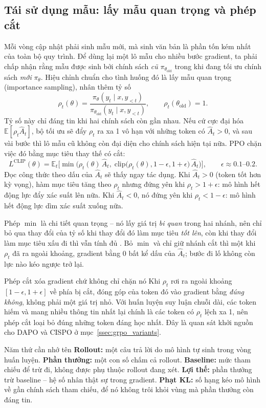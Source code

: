 \subsection{Tái sử dụng mẫu: lấy mẫu quan trọng và phép cắt}
\label{ssec:importance_clip}

Mỗi vòng cập nhật phải sinh mẫu mới, mà sinh văn bản là phần tốn kém nhất của toàn bộ quy trình. Để dùng lại một lô mẫu cho nhiều bước gradient, ta phải chấp nhận rằng mẫu được sinh bởi chính sách \emph{cũ} $\pi_{\theta_{\text{old}}}$ trong khi đang tối ưu chính sách \emph{mới} $\pi_{\theta}$. Hiệu chỉnh chuẩn cho tình huống đó là lấy mẫu quan trọng (importance sampling), nhân thêm tỷ số
\[
	\rho_t(\theta) = \frac{
		\pi_{\theta}(y_t \mid x, y_{<t})
	}{
		\pi_{\theta_{\text{old}}}(y_t \mid x, y_{<t})
	},
	\qquad
	\rho_t(\theta_{\text{old}}) = 1 .
\]
Tỷ số này chỉ đáng tin khi hai chính sách còn gần nhau. Nếu cứ cực đại hóa $\mathbb{E}[\rho_t \hat{A}_t]$, bộ tối ưu sẽ đẩy $\rho_t$ ra xa 1 vô hạn với những token có $\hat{A}_t > 0$, và sau vài bước thì lô mẫu cũ không còn đại diện cho chính sách hiện tại nữa. PPO chặn việc đó bằng mục tiêu thay thế có cắt:
\[
	L^{\text{CLIP}}(\theta)
	= \mathbb{E}_{t}
	\Big[
		\min\Big(
			\rho_t(\theta) \, \hat{A}_t,\;
			\text{clip}\big(\rho_t(\theta), 1 - \epsilon, 1 + \epsilon\big) \, \hat{A}_t
		\Big)
	\Big],
	\qquad \epsilon \approx 0.1 \text{--} 0.2 .
\]
Đọc công thức theo dấu của $\hat{A}_t$ sẽ thấy ngay tác dụng. Khi $\hat{A}_t > 0$ (token tốt hơn kỳ vọng), hàm mục tiêu tăng theo $\rho_t$ nhưng đứng yên khi $\rho_t > 1 + \epsilon$: mô hình hết động lực đẩy xác suất lên nữa. Khi $\hat{A}_t < 0$, nó đứng yên khi $\rho_t < 1 - \epsilon$: mô hình hết động lực dìm xác suất xuống nữa.

Phép $\min$ là chi tiết quan trọng -- nó lấy giá trị \emph{bi quan} trong hai nhánh, nên chỉ bỏ qua thay đổi của tỷ số khi thay đổi đó làm mục tiêu \emph{tốt lên}, còn khi thay đổi làm mục tiêu xấu đi thì vẫn tính đủ \cite{schulman2017proximal}. Bỏ $\min$ và chỉ giữ nhánh cắt thì một khi $\rho_t$ đã ra ngoài khoảng, gradient bằng 0 bất kể dấu của $\hat{A}_t$; bước đi lố không còn lực nào kéo ngược trở lại.

\begin{pitfall}{Phép cắt xóa gradient chứ không chỉ chặn nó}
Khi $\rho_t$ rơi ra ngoài khoảng $[1-\epsilon, 1+\epsilon]$ về phía bị cắt, đóng góp của token đó vào gradient bằng \emph{đúng không}, không phải một giá trị nhỏ. Với huấn luyện suy luận chuỗi dài, các token hiếm và mang nhiều thông tin nhất lại chính là các token có $\rho_t$ lệch xa 1, nên phép cắt loại bỏ đúng những token đáng học nhất. Đây là quan sát khởi nguồn cho DAPO và CISPO ở mục~\ref{ssec:grpo_variants}.
\end{pitfall}

\begin{keyidea}{Năm thứ cần nhớ tên}
\textbf{Rollout:} một câu trả lời do mô hình tự sinh trong vòng huấn luyện.
\textbf{Phần thưởng:} một con số chấm cả rollout.
\textbf{Baseline:} mức tham chiếu để trừ đi, không được phụ thuộc rollout đang xét.
\textbf{Lợi thế:} phần thưởng trừ baseline -- hệ số nhân thật sự trong gradient.
\textbf{Phạt KL:} số hạng kéo mô hình về gần chính sách tham chiếu, để nó không trôi khỏi vùng mà phần thưởng còn đáng tin.
\end{keyidea}
